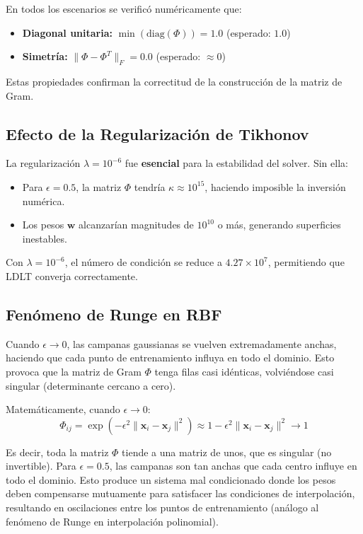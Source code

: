 \documentclass[12pt,a4paper]{article}
\theoremstyle{definition}
\newcommand{\norm}[1]{\|#1\|}
\newcommand{\vect}[1]{\mathbf{#1}}
\begin{document}
En todos los escenarios se verific\'{o} num\'{e}ricamente que:
\begin{itemize}
    \item \textbf{Diagonal unitaria:} $\min(\text{diag}(\Phi)) = 1.0$ (esperado: $1.0$)
    \item \textbf{Simetr\'{i}a:} $\norm{\Phi - \Phi^T}_F = 0.0$ (esperado: $\approx 0$)
\end{itemize}

Estas propiedades confirman la correctitud de la construcci\'{o}n de la matriz de Gram.

\subsection{Efecto de la Regularizaci\'{o}n de Tikhonov}

La regularizaci\'{o}n $\lambda = 10^{-6}$ fue \textbf{esencial} para la estabilidad del solver. Sin ella:
\begin{itemize}
    \item Para $\epsilon = 0.5$, la matriz $\Phi$ tendr\'{i}a $\kappa \approx 10^{15}$, haciendo imposible la inversi\'{o}n num\'{e}rica.
    \item Los pesos $\vect{w}$ alcanzar\'{i}an magnitudes de $10^{10}$ o m\'{a}s, generando superficies inestables.
\end{itemize}

Con $\lambda = 10^{-6}$, el n\'{u}mero de condici\'{o}n se reduce a $4.27 \times 10^7$, permitiendo que LDLT converja correctamente.

\subsection{Fen\'{o}meno de Runge en RBF}

Cuando $\epsilon \to 0$, las campanas gaussianas se vuelven extremadamente anchas, haciendo que cada punto de entrenamiento influya en todo el dominio. Esto provoca que la matriz de Gram $\Phi$ tenga filas casi id\'{e}nticas, volvi\'{e}ndose casi singular (determinante cercano a cero).

Matem\'{a}ticamente, cuando $\epsilon \to 0$:
\begin{equation}
\Phi_{ij} = \exp\left(-\epsilon^2 \norm{\vect{x}_i - \vect{x}_j}^2\right) \approx 1 - \epsilon^2 \norm{\vect{x}_i - \vect{x}_j}^2 \to 1
\end{equation}

Es decir, toda la matriz $\Phi$ tiende a una matriz de unos, que es singular (no invertible). Para $\epsilon = 0.5$, las campanas son tan anchas que cada centro influye en todo el dominio. Esto produce un sistema mal condicionado donde los pesos deben compensarse mutuamente para satisfacer las condiciones de interpolaci\'{o}n, resultando en oscilaciones entre los puntos de entrenamiento (an\'{a}logo al fen\'{o}meno de Runge en interpolaci\'{o}n polinomial).
\end{document}
